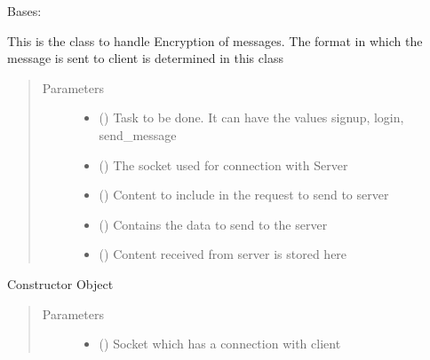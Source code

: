 \documentclass[letterpaper,10pt,english]{sphinxmanual}
\begin{document}
\begin{fulllineitems}
\label{\detokenize{Message:Message.Message}}
Bases: 

This is the class to handle Encryption of messages. The format in which the message is sent to client is determined in this class
\begin{quote}\begin{description}
\item[{Parameters}] \leavevmode\begin{itemize}
\item {} 
 () \textendash{} Task to be done. It can have the values signup, login, send\_message

\item {} 
 () \textendash{} The socket used for connection with Server

\item {} 
 () \textendash{} Content to include in the request to send to server

\item {} 
 () \textendash{} Contains the data to send to the server

\item {} 
 () \textendash{} Content received from server is stored here

\end{itemize}

\end{description}\end{quote}

Constructor Object
\begin{quote}\begin{description}
\item[{Parameters}] \leavevmode\begin{itemize}
\item {} 
 () \textendash{} Socket which has a connection with client


\end{itemize}
\end{description}
\end{quote}
\end{fulllineitems}
\end{document}
